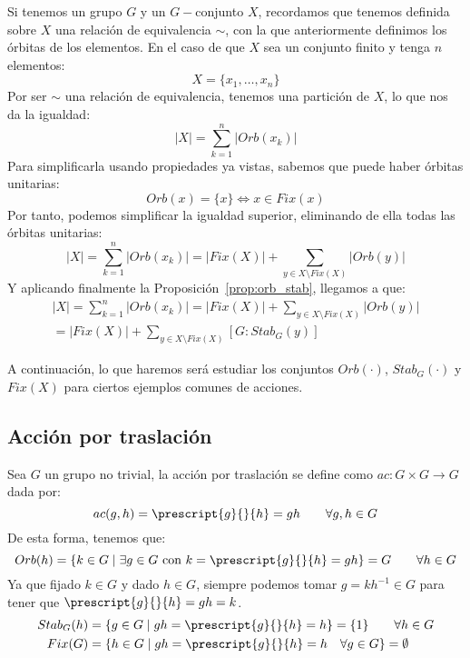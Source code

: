 \begin{observacion}
    Si tenemos un grupo $G$ y un $G-$conjunto $X$, recordamos que tenemos definida sobre $X$ una relación de equivalencia $\sim$, con la que anteriormente definimos los órbitas de los elementos. En el caso de que $X$ sea un conjunto finito y tenga $n$ elementos:
    \begin{equation*}
        X = \{x_1, \ldots, x_n\}
    \end{equation*}
    Por ser $\sim$ una relación de equivalencia, tenemos una partición de $X$, lo que nos da la igualdad:
    \begin{equation*}
        |X| = \sum_{k=1}^{n}|Orb(x_k)|
    \end{equation*}
    Para simplificarla usando propiedades ya vistas, sabemos que puede haber órbitas unitarias:
    \begin{equation*}
        Orb(x) = \{x\} \Longleftrightarrow x\in Fix(x)
    \end{equation*}
    Por tanto, podemos simplificar la igualdad superior, eliminando de ella todas las órbitas unitarias:
    \begin{equation*}
        |X| = \sum_{k=1}^{n}|Orb(x_k)| = |Fix(X)| + \sum_{y\in X\setminus Fix(X)}|Orb(y)|
    \end{equation*}
    Y aplicando finalmente la Proposición~\ref{prop:orb_stab}, llegamos a que:
    \begin{multline*}
        |X| = \sum_{k=1}^{n}|Orb(x_k)| = |Fix(X)| + \sum_{y\in X\setminus Fix(X)}|Orb(y)| \\ = |Fix(X)| + \sum_{y\in X\setminus Fix(X)} [G:Stab_G(y)]
    \end{multline*}
\end{observacion}

\noindent
A continuación, lo que haremos será estudiar los conjuntos $Orb(\cdot )$, $Stab_G(\cdot )$ y $Fix(X)$ para ciertos ejemplos comunes de acciones.
\subsection{Acción por traslación}
\noindent
Sea $G$ un grupo no trivial, la acción por traslación se define como $ac:G\times G\to G$ dada por:
\begin{equation*}
    ac(g,h) = \prescript{g}{}{h} = gh \qquad \forall g,h\in G
\end{equation*}
De esta forma, tenemos que:
\begin{equation*}
    Orb(h) = \{k\in G \mid \exists g\in G \text{\ con\ } k = \prescript{g}{}{h} = gh\} = G \qquad \forall h\in G
\end{equation*}
Ya que fijado $k\in G$ y dado $h\in G$, siempre podemos tomar $g = kh^{-1}\in G$ para tener que $\prescript{g}{}{h} = gh = k$.
\begin{align*}
    Stab_G(h) &= \{g\in G \mid gh = \prescript{g}{}{h} = h\} = \{1\} \qquad \forall h\in G\\
    Fix(G) &= \{h\in G \mid gh = \prescript{g}{}{h}=h \quad \forall g\in G\} = \emptyset 
\end{align*}

